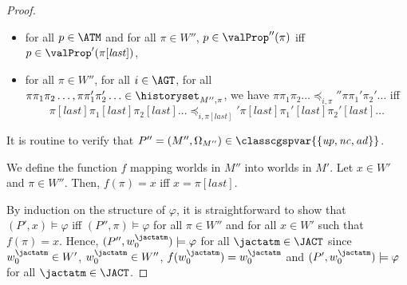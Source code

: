 \begin{proof}
\begin{itemize}
\item for all $p \in \ATM$ and for all $\pi  \in W''$,
$p \in \valProp''( \pi )$
iff $p \in \valProp'( \pi [\mathit{last}])$,

\item 
for all $\pi  \in W''$,
for all $i \in \AGT $, for all $\pi \pi_1
\pi_2 \ldots ,
\pi \pi_1'
\pi_2' \ldots \in \historyset_{M'',\pi  }$, 
we have 
$\pi \pi_1
\pi_2 \ldots \preceq_{i,\pi   }''  \pi \pi_1'
\pi_2' \ldots $
iff 
$$
\pi[\mathit{last}]
\pi_1[\mathit{last}]
\pi_2[\mathit{last}]\ldots 
\preceq_{i,\pi [\mathit{last}]  }'  \pi [\mathit{last}]
\pi_1'[\mathit{last}]
\pi_2' [\mathit{last}]\ldots  $$ %



\end{itemize}

It is routine to verify that $P''=(M'',\Omega_{M''})
\in \classcgspvar{\{  \mathit{up} ,
\mathit{nc},\mathit{ad}  \}} $. 


We  define the function $f$
mapping worlds in $M''$
into worlds in $M' $.
Let $x \in W' $
and $\pi  \in W'' $.
Then,
$f(\pi   ) = x $
iff
$x=\pi  [\mathit{last}]$. 



  By induction on the structure of $\varphi$,
  it is straightforward 
  to show that
$(P',x )  \models \varphi$
iff
$(P'',\pi   )  \models \varphi$
for all $\pi  \in W''$
and for all $x \in W' $
such that $f(\pi) =x $.
Hence, $(P'', w_0^{\jactatm}  ) \models \varphi$
for all 
 $\jactatm \in \JACT $
since $w_0^{\jactatm}  \in W'$,
$w_0^{\jactatm}  \in W''$,
$f(w_0^{\jactatm} )=w_0^{\jactatm} $
and 
$(P', w_0^{\jactatm}  ) \models \varphi$
for all 
 $\jactatm \in \JACT $. 








\end{proof}
